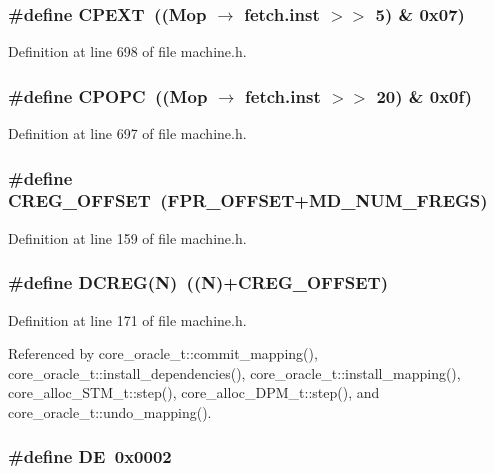 \subsubsection[{CPEXT}]{\setlength{\rightskip}{0pt plus 5cm}\#define CPEXT~((Mop $\rightarrow$ fetch.inst $>$$>$ 5) \& 0x07)}\label{machine_8h_a7f52965a919ba2b216077c1eeb91721}




Definition at line 698 of file machine.h.
\subsubsection[{CPOPC}]{\setlength{\rightskip}{0pt plus 5cm}\#define CPOPC~((Mop $\rightarrow$ fetch.inst $>$$>$ 20) \& 0x0f)}\label{machine_8h_0375304d4cf81efe624d2a3a2a2aac91}




Definition at line 697 of file machine.h.
\subsubsection[{CREG\_\-OFFSET}]{\setlength{\rightskip}{0pt plus 5cm}\#define CREG\_\-OFFSET~(FPR\_\-OFFSET+MD\_\-NUM\_\-FREGS)}\label{machine_8h_c5b7c3261c3b1cd415175079880675e1}




Definition at line 159 of file machine.h.
\subsubsection[{DCREG}]{\setlength{\rightskip}{0pt plus 5cm}\#define DCREG(N)~((N)+CREG\_\-OFFSET)}\label{machine_8h_d80e74580200731f87e13556d877b32f}




Definition at line 171 of file machine.h.

Referenced by core\_\-oracle\_\-t::commit\_\-mapping(), core\_\-oracle\_\-t::install\_\-dependencies(), core\_\-oracle\_\-t::install\_\-mapping(), core\_\-alloc\_\-STM\_\-t::step(), core\_\-alloc\_\-DPM\_\-t::step(), and core\_\-oracle\_\-t::undo\_\-mapping().
\subsubsection[{DE}]{\setlength{\rightskip}{0pt plus 5cm}\#define DE~0x0002}\label{machine_8h_c5cd1df510905c1131e6e07e552d5bb3}




